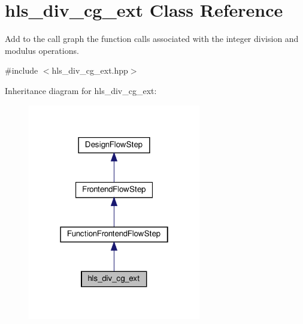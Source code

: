 \hypertarget{classhls__div__cg__ext}{}\section{hls\+\_\+div\+\_\+cg\+\_\+ext Class Reference}
\label{classhls__div__cg__ext}


Add to the call graph the function calls associated with the integer division and modulus operations.  




{\ttfamily \#include $<$hls\+\_\+div\+\_\+cg\+\_\+ext.\+hpp$>$}



Inheritance diagram for hls\+\_\+div\+\_\+cg\+\_\+ext\+:
\nopagebreak
\begin{figure}[H]
\begin{center}
\leavevmode
\includegraphics[width=214pt]{d0/df0/classhls__div__cg__ext__inherit__graph}
\end{center}
\end{figure}


